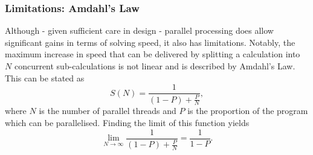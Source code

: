 		\subsubsection{Limitations: Amdahl's Law}
		
			Although - given sufficient care in design - parallel processing does allow significant gains in terms of solving speed, it also has limitations. Notably, the maximum increase in speed that can be delivered by splitting a calculation into $N$ concurrent sub-calculations is not linear and is described by Amdahl's Law. This can be stated as
			\[
				S(N) = \frac{1}{(1-P) + \frac{P}{N}},
			\]
			where $N$ is the number of parallel threads and $P$ is the proportion of the program which can be parallelised. Finding the limit of this function yields
			\[
				\lim\limits_{N \to \infty}\frac{1}{(1-P) + \frac{P}{N}} = \frac{1}{1-P}.
			\]
